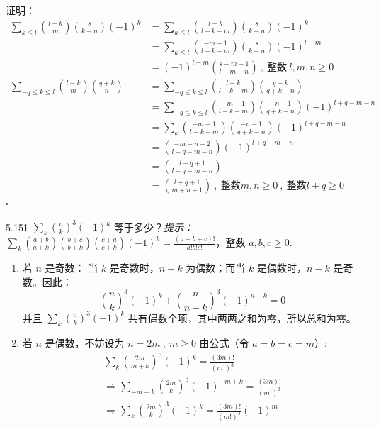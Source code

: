 证明：
\begin{align*}
  \sum_{k \le l} \binom{l-k}{m} \binom{s}{k-n} (-1)^k &= \sum_{k \le l} \binom{l-k}{l-k-m} \binom{s}{k-n} (-1)^{k} \\
  &= \sum_{k \le l} \binom{-m-1}{l-k-m} \binom{s}{k-n} (-1)^{l-m} \\
  &= (-1)^{l-m} \binom{s-m-1}{l-m-n} \ , \ \text{整数} \ l, m, n \ge 0 \\[6pt]
  \sum_{-q \le k \le l} \binom{l-k}{m} \binom{q+k}{n} &= \sum_{-q \le k \le l} \binom{l-k}{l-k-m} \binom{q+k}{q+k-n} \\
  &= \sum_{-q \le k \le l} \binom{-m-1}{l-k-m} \binom{-n-1}{q+k-n} (-1)^{l+q-m-n} \\
  &= \sum_k \binom{-m-1}{l-k-m} \binom{-n-1}{q+k-n} (-1)^{l+q-m-n} \\
  &= \binom{-m-n-2}{l+q-m-n} (-1)^{l+q-m-n} \\
  &= \binom{l+q+1}{l+q-m-n} \\
  &= \binom{l+q+1}{m+n+1} \ , \ \text{整数} m, n \ge 0 \ , \ \text{整数} l + q \ge 0
\end{align*}
\hfill \( \square \)

\begin{problem}{5.15}{1}
  \( \sum_k \binom{n}{k}^3 (-1)^k \) 等于多少？\textit{提示：}\( \sum_k \binom{a+b}{a+k} \binom{b+c}{b+k} \binom{c+a}{c+k} (-1)^k = \frac{(a+b+c)!}{a!b!c!} \)，整数 \( a, b, c \ge 0 \).
\end{problem}

\begin{enumerate}
  \item[1.] 若 \( n \) 是奇数：
    当 \( k \) 是奇数时，\( n-k \) 为偶数；而当 \( k \) 是偶数时，\( n-k \) 是奇数。因此：
    \[
      \binom{n}{k}^3 (-1)^k + \binom{n}{n-k}^3 (-1)^{n-k} = 0
    \]
    并且 \( \sum_k \binom{n}{k}^3 (-1)^k \) 共有偶数个项，其中两两之和为零，所以总和为零。

  \item[2.] 若 \( n \) 是偶数，不妨设为 \( n = 2m \ , \ m \ge 0 \)
    由公式（令 \( a = b = c = m \)）:
    \begin{gather*}
      \sum_{k} \binom{2m}{m+k}^3 (-1)^k = \frac{(3m)!}{(m!)^3} \\
      \Rightarrow
      \sum_{-m+k} \binom{2m}{k}^3 (-1)^{-m+k} = \frac{(3m)!}{(m!)^3} \\
      \Rightarrow
      \sum_k \binom{2m}{k}^3 (-1)^k = \frac{(3m)!}{(m!)^3} (-1)^m
    \end{gather*}
\end{enumerate}

